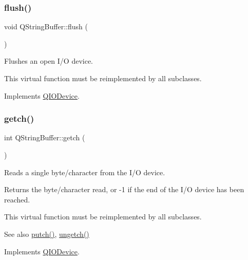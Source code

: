 \subsubsection{\texorpdfstring{flush()}{flush()}}
{\footnotesize\ttfamily void Q\+String\+Buffer\+::flush (\begin{DoxyParamCaption}{ }\end{DoxyParamCaption})\hspace{0.3cm}{\ttfamily [virtual]}}

Flushes an open I/O device.

This virtual function must be reimplemented by all subclasses. 

Implements \mbox{\hyperlink{class_q_i_o_device_a39eccb592ae076fbc42108a3d590fb43}{Q\+I\+O\+Device}}.

\mbox{\label{class_q_string_buffer_acebe86e5beeaff3863673fc56089e2da}} 
\subsubsection{\texorpdfstring{getch()}{getch()}}
{\footnotesize\ttfamily int Q\+String\+Buffer\+::getch (\begin{DoxyParamCaption}{ }\end{DoxyParamCaption})\hspace{0.3cm}{\ttfamily [virtual]}}

Reads a single byte/character from the I/O device.

Returns the byte/character read, or -\/1 if the end of the I/O device has been reached.

This virtual function must be reimplemented by all subclasses.

\begin{DoxySeeAlso}{See also}
\mbox{\hyperlink{class_q_string_buffer_ac95cff6e837ae523527b9d78cb6a4074}{putch()}}, \mbox{\hyperlink{class_q_string_buffer_ad6e53fb9f2f2969b9f9a7a1daa2d7af2}{ungetch()}} 
\end{DoxySeeAlso}


Implements \mbox{\hyperlink{class_q_i_o_device_a7cef61d66023f9cda6b0912082bd19fc}{Q\+I\+O\+Device}}.

\mbox{\label{class_q_string_buffer_a593d2870764f6888dd1aabea55304a46}} 
